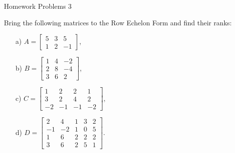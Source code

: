  \begin{center}\begin{large} Homework Problems 3\end{large}\end{center}
 \bigskip


\begin{problem}%
    Bring the following matrices to the Row Echelon Form and find their ranks:

    \begin{enumerate}
        \item[a) ] $A=\begin{bmatrix}5&3&5\\1&2&-1\end{bmatrix}$,
        
        \item[b) ] $B=\begin{bmatrix}1&4&-2\\2&8&-4\\3&6&2\end{bmatrix}$,
        
        \item[c) ] $C=\begin{bmatrix}1&2&2&1\\3&2&4&2\\-2&-1&-1&-2\end{bmatrix}$,
        
        \item[d) ] $D=\begin{bmatrix}2&4&1&3&2\\-1&-2&1&0&5\\1&6&2&2&2\\3&6&2&5&1\end{bmatrix}$.
    \end{enumerate}
\end{problem}
 \bigskip


